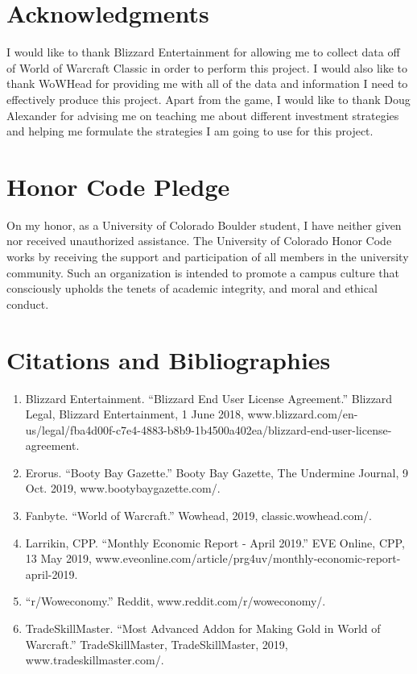 \documentclass[sigconf]{acmart}
\begin{document}
\section{Acknowledgments}
I would like to thank Blizzard Entertainment for allowing me to collect data off of World of Warcraft Classic in order to perform this project. I would also like to thank WoWHead for providing me with all of the data and information I need to effectively produce this project. Apart from the game, I would like to thank Doug Alexander for advising me on teaching me about different investment strategies and helping me formulate the strategies I am going to use for this project.

\section{Honor Code Pledge}
On my honor, as a University of Colorado Boulder student, I have neither given nor received unauthorized assistance. The University of Colorado Honor Code works by receiving the support and participation of all members in the university community. Such an organization is intended to promote a campus culture that consciously upholds the tenets of academic integrity, and moral and ethical conduct.

\section{Citations and Bibliographies}
\begin{enumerate}
	\item Blizzard Entertainment. “Blizzard End User License Agreement.” Blizzard Legal, Blizzard Entertainment, 1 June 2018, www.blizzard.com/en-us/legal/fba4d00f-c7e4-4883-b8b9-1b4500a402ea/blizzard-end-user-license-agreement.
	\item Erorus. “Booty Bay Gazette.” Booty Bay Gazette, The Undermine Journal, 9 Oct. 2019, www.bootybaygazette.com/.
	\item Fanbyte. “World of Warcraft.” Wowhead, 2019, classic.wowhead.com/.
	\item Larrikin, CPP. “Monthly Economic Report - April 2019.” EVE Online, CPP, 13 May 2019, www.eveonline.com/article/prg4uv/monthly-economic-report-april-2019.
	\item “r/Woweconomy.” Reddit, www.reddit.com/r/woweconomy/.
	\item TradeSkillMaster. “Most Advanced Addon for Making Gold in World of Warcraft.” TradeSkillMaster, TradeSkillMaster, 2019, www.tradeskillmaster.com/.
\end{enumerate}
\end{document}
